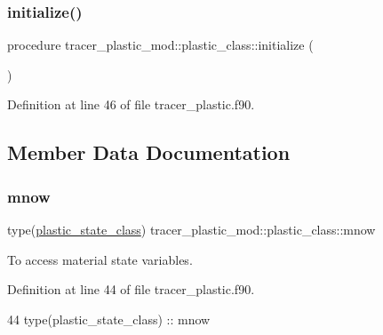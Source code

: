 \subsubsection{\texorpdfstring{initialize()}{initialize()}}
{\footnotesize\ttfamily procedure tracer\+\_\+plastic\+\_\+mod\+::plastic\+\_\+class\+::initialize (\begin{DoxyParamCaption}{ }\end{DoxyParamCaption})\hspace{0.3cm}{\ttfamily [private]}}



Definition at line 46 of file tracer\+\_\+plastic.\+f90.



\subsection{Member Data Documentation}
\mbox{\label{structtracer__plastic__mod_1_1plastic__class_ae30b971a131c8203026a7631dff3a51f}} 
\subsubsection{\texorpdfstring{mnow}{mnow}}
{\footnotesize\ttfamily type(\mbox{\hyperlink{structtracer__plastic__mod_1_1plastic__state__class}{plastic\+\_\+state\+\_\+class}}) tracer\+\_\+plastic\+\_\+mod\+::plastic\+\_\+class\+::mnow\hspace{0.3cm}{\ttfamily [private]}}



To access material state variables. 



Definition at line 44 of file tracer\+\_\+plastic.\+f90.


\begin{DoxyCode}
44         \textcolor{keywordtype}{type}(plastic\_state\_class) :: mnow
\end{DoxyCode}
\mbox{\label{structtracer__plastic__mod_1_1plastic__class_ae1a94a8bd2796aa13dfa820845f56563}} 
